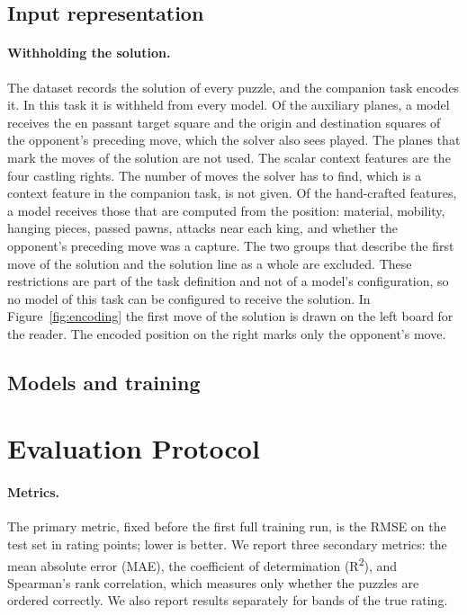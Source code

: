 \documentclass[11pt]{article}
\begin{document}
\subsection{Input representation}
\label{sec:input}



\paragraph{Withholding the solution.}
The dataset records the solution of every puzzle, and the companion task
encodes it. In this task it is withheld from every model. Of the auxiliary
planes, a model receives the en passant target square and the origin and
destination squares of the opponent's preceding move, which the solver also
sees played. The planes that mark the moves of the solution are not used. The
scalar context features are the four castling rights. The number of moves the
solver has to find, which is a context feature in the companion task, is not
given. Of the hand-crafted features, a model receives those that are computed
from the position: material, mobility, hanging pieces, passed pawns, attacks
near each king, and whether the opponent's preceding move was a capture. The
two groups that describe the first move of the solution and the solution line
as a whole are excluded. These restrictions are part of the task definition
and not of a model's configuration, so no model of this task can be
configured to receive the solution.
\iflook
In Figure~\ref{fig:encoding} the first move of the solution is drawn on the
left board for the reader. The encoded position on the right marks only the
opponent's move.
\fi

\subsection{Models and training}
\label{sec:models}



\section{Evaluation Protocol}
\label{sec:protocol}

\paragraph{Metrics.}
The primary metric, fixed before the first full training run, is the RMSE on
the test set in rating points; lower is better. We report three secondary
metrics: the mean absolute error (MAE), the coefficient of determination
(R\textsuperscript{2}), and Spearman's rank correlation, which measures only whether the
puzzles are ordered correctly. We also report results separately for
 bands of the true rating.
\end{document}
